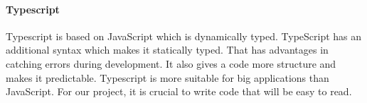 \paragraph*{Typescript} Typescript is based on JavaScript which is dynamically typed. TypeScript has an additional syntax which makes it statically typed. That has advantages in catching errors during development. It also gives a code more structure and makes it predictable. Typescript is more suitable for big applications than JavaScript. For our project, it is crucial to write code that will be easy to read.

